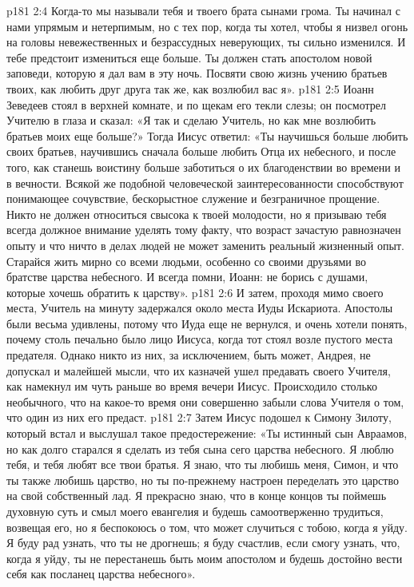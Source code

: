 \vs p181 2:4 Когда\hyp{}то мы называли тебя и твоего брата сынами грома. Ты начинал с нами упрямым и нетерпимым, но с тех пор, когда ты хотел, чтобы я низвел огонь на головы невежественных и безрассудных неверующих, ты сильно изменился. И тебе предстоит измениться еще больше. Ты должен стать апостолом новой заповеди, которую я дал вам в эту ночь. Посвяти свою жизнь учению братьев твоих, как любить друг друга так же, как возлюбил вас я».
\vs p181 2:5 Иоанн Зеведеев стоял в верхней комнате, и по щекам его текли слезы; он посмотрел Учителю в глаза и сказал: «Я так и сделаю Учитель, но как мне возлюбить братьев моих еще больше?» Тогда Иисус ответил: «Ты научишься больше любить своих братьев, научившись сначала больше любить Отца их небесного, и после того, как станешь воистину больше заботиться о их благоденствии во времени и в вечности. Всякой же подобной человеческой заинтересованности способствуют понимающее сочувствие, бескорыстное служение и безграничное прощение. Никто не должен относиться свысока к твоей молодости, но я призываю тебя всегда должное внимание уделять тому факту, что возраст зачастую равнозначен опыту и что ничто в делах людей не может заменить реальный жизненный опыт. Старайся жить мирно со всеми людьми, особенно со своими друзьями во братстве царства небесного. И всегда помни, Иоанн: не борись с душами, которые хочешь обратить к царству».
\vs p181 2:6 \pc И затем, проходя мимо своего места, Учитель на минуту задержался около места Иуды Искариота. Апостолы были весьма удивлены, потому что Иуда еще не вернулся, и очень хотели понять, почему столь печально было лицо Иисуса, когда тот стоял возле пустого места предателя. Однако никто из них, за исключением, быть может, Андрея, не допускал и малейшей мысли, что их казначей ушел предавать своего Учителя, как намекнул им чуть раньше во время вечери Иисус. Происходило столько необычного, что на какое\hyp{}то время они совершенно забыли слова Учителя о том, что один из них его предаст.
\vs p181 2:7 \pc Затем Иисус подошел к Симону Зилоту, который встал и выслушал такое предостережение: «Ты истинный сын Авраамов, но как долго старался я сделать из тебя сына сего царства небесного. Я люблю тебя, и тебя любят все твои братья. Я знаю, что ты любишь меня, Симон, и что ты также любишь царство, но ты по\hyp{}прежнему настроен переделать это царство на свой собственный лад. Я прекрасно знаю, что в конце концов ты поймешь духовную суть и смыл моего евангелия и будешь самоотверженно трудиться, возвещая его, но я беспокоюсь о том, что может случиться с тобою, когда я уйду. Я буду рад узнать, что ты не дрогнешь; я буду счастлив, если смогу узнать, что, когда я уйду, ты не перестанешь быть моим апостолом и будешь достойно вести себя как посланец царства небесного».
